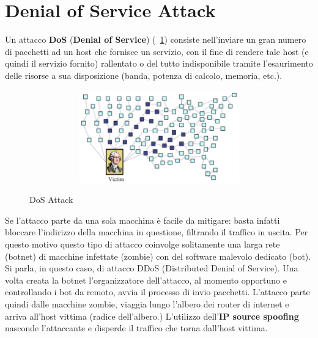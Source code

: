 \section{Denial of Service Attack}
Un attacco \textbf{DoS} (\textbf{Denial of Service}) (\figurename~\ref{fig:DoS_Attack}) consiste nell'inviare un gran numero di pacchetti ad un host che fornisce un servizio, con il fine di rendere tale host (e quindi il servizio fornito) rallentato o del tutto indisponibile tramite l'esaurimento delle risorse a sua disposizione (banda, potenza di calcolo, memoria, etc.).
\begin{figure}[htbp]
	\centering%
	\subfigure%
	{\includegraphics[height=4cm, width=12cm, keepaspectratio]{Immagini/reti/DoS_Attack.png}}
	\caption{DoS Attack\label{fig:DoS_Attack}} 	
\end{figure}
Se l'attacco parte da una sola macchina è facile da mitigare: basta infatti bloccare l'indirizzo della macchina in questione, filtrando il traffico in uscita. Per questo motivo questo tipo di attacco coinvolge solitamente una larga rete (botnet) di macchine infettate (zombie) con del software malevolo dedicato (bot). Si parla, in questo caso, di attacco DDoS (Distributed Denial of Service). Una volta creata la botnet l'organizzatore dell'attacco, al momento opportuno e controllando i bot da remoto, avvia il processo di invio pacchetti.
\newline \newline
L'attacco parte quindi dalle macchine zombie, viaggia lungo l'albero dei router di internet e arriva all'host vittima (radice dell'albero.) L'utilizzo dell'\textbf{IP source spoofing} nasconde l'attaccante e disperde il traffico che torna dall'host vittima.
\newline \newline
